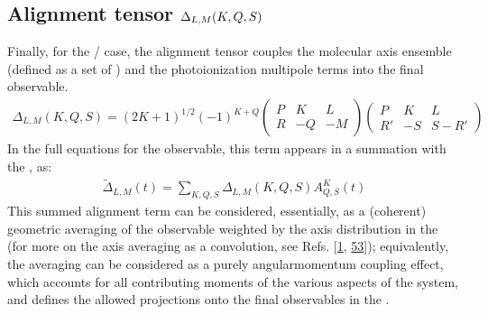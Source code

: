 \documentclass[letterpaper,table,10pt,english]{jupyterBook}
\begin{document}
\subsection{Alignment tensor \protect\(\Delta_{L,M}(K,Q,S)\protect\)}
\label{\detokenize{part1/theory_tensor_formalism_201122:alignment-tensor-delta-l-m-k-q-s}}\label{\detokenize{part1/theory_tensor_formalism_201122:sec-theory-af-alignment-term}}
\sphinxAtStartPar
Finally, for the {\hyperref[\detokenize{backmatter/glossary:term-LF}]{}}/{\hyperref[\detokenize{backmatter/glossary:term-AF}]{}} case, the alignment tensor couples the molecular axis ensemble (defined as a set of {\hyperref[\detokenize{backmatter/glossary:term-ADMs}]{}}) and the photoionization multipole terms into the final observable.
\begin{equation}\label{equation:part1/theory_tensor_formalism_201122:eq:basis-alignmentTensor-defn}
\begin{split}
\Delta_{L,M}(K,Q,S)=(2K+1)^{1/2}(-1)^{K+Q}\left(\begin{array}{ccc}
P & K & L\\
R & -Q & -M
\end{array}\right)\left(\begin{array}{ccc}
P & K & L\\
R' & -S & S-R'
\end{array}\right)
\end{split}
\end{equation}
\sphinxAtStartPar
In the full equations for the observable, this term appears in a summation with the {\hyperref[\detokenize{backmatter/glossary:term-ADMs}]{}}, as:
\begin{equation}\label{equation:part1/theory_tensor_formalism_201122:eq:basis-aligmentTerm-defn}
\begin{split}
\tilde{\Delta}_{L,M}(t) = \sum_{K,Q,S}\Delta_{L,M}(K,Q,S)A_{Q,S}^{K}(t)
\end{split}
\end{equation}
\sphinxAtStartPar
This summed alignment term can be considered, essentially, as a (coherent) geometric averaging of the {\hyperref[\detokenize{backmatter/glossary:term-MF}]{}} observable weighted by the axis distribution in the {\hyperref[\detokenize{backmatter/glossary:term-AF}]{}} (for more on the axis averaging as a convolution, see Refs. {[}\hyperlink{cite.backmatter/bibliography:id613}{1}, \hyperlink{cite.backmatter/bibliography:id842}{53}{]}); equivalently, the averaging can be considered as a purely angular\sphinxhyphen{}momentum coupling effect, which accounts for all contributing moments of the various aspects of the system, and defines the allowed projections onto the final observables in the {\hyperref[\detokenize{backmatter/glossary:term-LF}]{}}.
\end{document}
